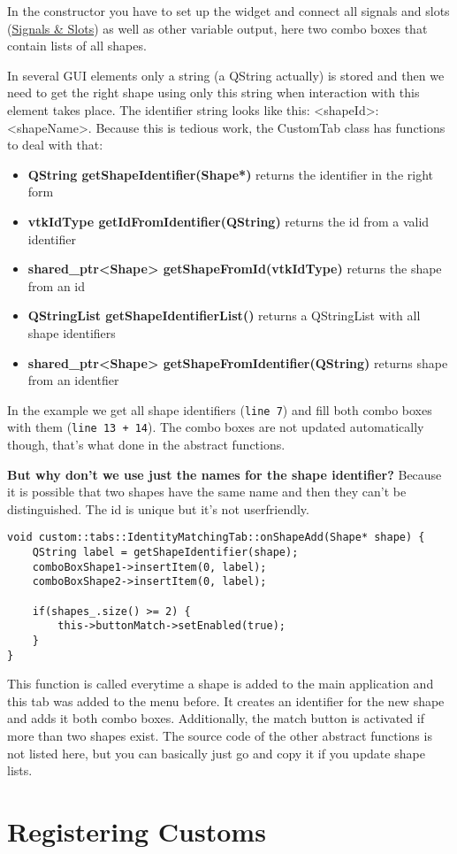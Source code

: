 In the constructor you have to set up the widget and connect all signals and slots (\href{http://qt-project.org/doc/qt-4.8/signalsandslots.html}{Signals \& Slots}) as well as other variable output, here two combo boxes that contain lists of all shapes. 

In several GUI elements only a string (a QString actually) is stored and then we need to get the right shape using only this string when interaction with this element takes place. The identifier string looks like this: <shapeId>:<shapeName>. Because this is tedious work, the CustomTab class has functions to deal with that: 

\begin{itemize}
	\item \textbf{QString getShapeIdentifier(Shape*)} returns the identifier in the right form
	\item \textbf{vtkIdType getIdFromIdentifier(QString)} returns the id from a valid identifier
	\item \textbf{shared\_ptr<Shape> getShapeFromId(vtkIdType)} returns the shape from an id
	\item \textbf{QStringList getShapeIdentifierList()} returns a QStringList with all shape identifiers
	\item \textbf{shared\_ptr<Shape> getShapeFromIdentifier(QString)} returns shape from an identfier
\end{itemize}

In the example we get all shape identifiers (\texttt{line 7}) and fill both combo boxes with them (\texttt{line 13 + 14}). The combo boxes are not updated automatically though, that's what done in the abstract functions. 

\begin{mdframed}
\textbf{But why don't we use just the names for the shape identifier?} Because it is possible that two shapes have the same name and then they can't be distinguished. The id is unique but it's not userfriendly.
\end{mdframed}

\begin{lstlisting}[style=lstStyleCpp, caption={IdentityMatchingTab.cpp, onShapeAdd}]
void custom::tabs::IdentityMatchingTab::onShapeAdd(Shape* shape) {
    QString label = getShapeIdentifier(shape);
    comboBoxShape1->insertItem(0, label);
    comboBoxShape2->insertItem(0, label);
    
    if(shapes_.size() >= 2) {
        this->buttonMatch->setEnabled(true);
    }
}
\end{lstlisting}

This function is called everytime a shape is added to the main application and this tab was added to the menu before. It creates an identifier for the new shape and adds it both combo boxes. Additionally, the match button is activated if more than two shapes exist. The source code of the other abstract functions is not listed here, but you can basically just go and copy it if you update shape lists. 

\section{Registering Customs}
\label{sec:RegisterCustoms}